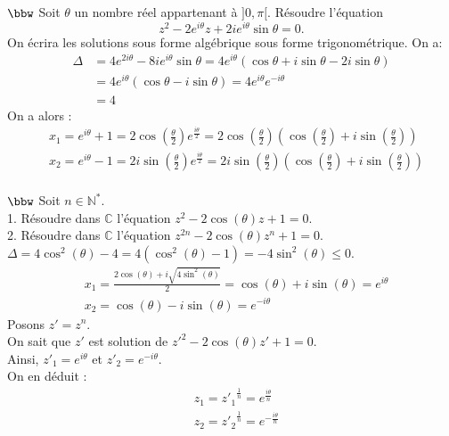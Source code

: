\documentclass[11pt]{article}
\begin{document}
\begin{exercice}{$\bbw$}{}
    Soit $\theta$ un nombre réel appartenant à $]0,\pi[$. Résoudre l'équation
    \begin{equation*}
        z^2 - 2e^{i\theta}z + 2ie^{i\theta}\sin\theta=0.
    \end{equation*}
    On écrira les solutions sous forme algébrique  sous forme trigonométrique.
    \tcblower
    On a:
    \begin{align*}
        \Delta&=4e^{2i\theta}-8ie^{i\theta}\sin\theta = 4e^{i\theta}\left(\cos\theta + i\sin\theta - 2i\sin\theta \right) \\
        &= 4e^{i\theta}(\cos\theta-i\sin\theta) = 4e^{i\theta}e^{-i\theta}\\
        &=4
    \end{align*}
    On a alors :
    \begin{align*}
        &x_1 = e^{i\theta} + 1 = 2\cos\left( \frac{\theta}{2} \right)e^{\frac{i\theta}{2}}=2\cos\left( \frac{\theta}{2} \right)\left( \cos\left( \frac{\theta}{2} \right) + i\sin\left( \frac{\theta}{2} \right) \right)\\
        &x_2 = e^{i\theta} - 1 = 2i\sin\left( \frac{\theta}{2} \right)e^{\frac{i\theta}{2}}=2i\sin\left( \frac{\theta}{2} \right)\left( \cos\left( \frac{\theta}{2} \right) + i\sin\left( \frac{\theta}{2} \right) \right)\\
    \end{align*}
\end{exercice}

\begin{exercice}{$\bbw$}{}
    Soit $n\in\mathbb{N}^*$.\\
    1. Résoudre dans $\mathbb{C}$ l'équation $z^2 - 2\cos(\theta)z + 1 = 0$.\\
    2. Résoudre dans $\mathbb{C}$ l'équation $z^{2n} - 2\cos(\theta)z^n + 1 = 0$.
    \tcblower
     $\Delta = 4\cos^2(\theta)-4=4(\cos^2(\theta)-1)=-4\sin^2(\theta) \leq 0$.
    \begin{align*}
        &x_1 = \frac{2\cos(\theta)+i\sqrt{4\sin^2(\theta)}}{2}=\cos(\theta)+i\sin(\theta)=e^{i\theta}\\
        &x_2 = \cos(\theta) - i\sin(\theta) = e^{-i\theta}
    \end{align*}
     Posons $z' = z^n$.\\
    On sait que $z'$ est solution de $z'^2-2\cos(\theta)z'+1=0$.\\
    Ainsi, $z'_1 = e^{i\theta}$ et $z'_2=e^{-i\theta}$.\\
    On en déduit :
    \begin{align*}
        &z_1 = {z'_1}^{\frac{1}{n}}=e^{\frac{i\theta}{n}}\\
        &z_2={z'_2}^{\frac{1}{n}}=e^{-\frac{i\theta}{n}}
    \end{align*}
\end{exercice}
\end{document}
